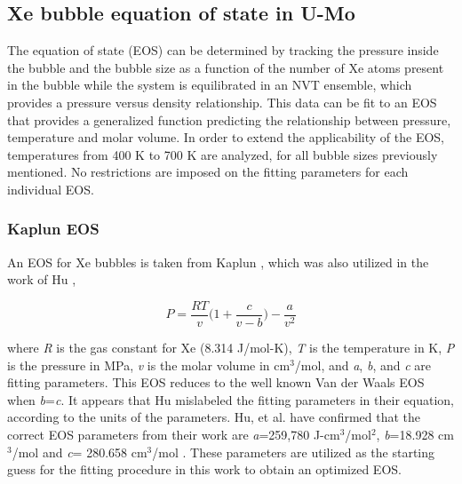 \documentclass[review]{elsarticle}
\begin{document}
\FloatBarrier

\subsection{Xe bubble equation of state in U-Mo}

The equation of state (EOS) can be determined by tracking the pressure inside the bubble and the bubble size as a function of the number of Xe atoms present in the bubble while the system is equilibrated in an NVT ensemble, which provides a pressure versus density relationship. This data can be fit to an EOS that provides a generalized function predicting the relationship between pressure, temperature and molar volume. In order to extend the applicability of the EOS, temperatures from 400 K to 700 K are analyzed, for all bubble sizes previously mentioned. No restrictions are imposed on the fitting parameters for each individual EOS. 

\subsubsection{Kaplun EOS}\label{kapluneos}

An EOS for Xe bubbles is taken from Kaplun \cite{kaplun2003}, which was also utilized in the work of Hu \cite{hu2017}, 

\begin{equation}
\label{eq:EOS}
P=\frac{RT}{v}\bigg( 1+\frac{c}{v-b}\bigg)-\frac{a}{v^2}
\end{equation}
				
where \textit{R} is the gas constant for Xe (8.314 J/mol-K\cite{kaplun2003}), \textit{T} is the temperature in K, \textit{P} is the pressure in MPa, \textit{v} is the molar volume in cm$^3$/mol, and \textit{a}, \textit{b}, and \textit{c} are fitting parameters. This EOS reduces to the well known Van der Waals EOS when \textit{b}=\textit{c}. It appears that Hu \cite{hu2017} mislabeled the fitting parameters in their equation, according to the units of the parameters. Hu, et al. have confirmed that the correct EOS parameters from their work are \textit{a}=259,780 J-cm$^3$/mol$^2$, \textit{b}=18.928 cm$^3$/mol and \textit{c}= 280.658 cm$^3$/mol \cite{hu2017}. These parameters are utilized as the starting guess for the fitting procedure in this work to obtain an optimized EOS. 
\end{document}
